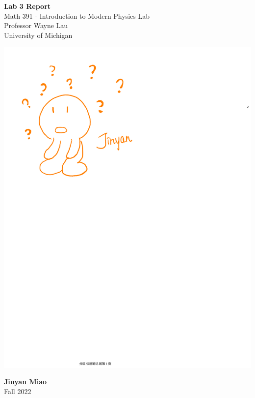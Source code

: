 \documentclass[11pt]{book}
\theoremstyle{break}
\theoremstyle{break}
\begin{document}
	\begin{titlepage}
		\begin{center}
			\vspace*{1cm}
			\Huge \color{red}
				\textbf{Lab 3 Report}\\
			\vspace{0.5cm}			
			\Large \color{black}
				Math 391 - Introduction to Modern Physics Lab\\
				Professor Wayne Lau\\	
				University of Michigan\\
			\vspace{3cm}

			\includegraphics[scale=0.8]{Jinyan'sQuestion.pdf}
			
			
			\vspace{5cm}
			\LARGE
				\textbf{Jinyan Miao}\\
				\hfill\break
				\LARGE Fall 2022\\
			\vspace{1cm}

		\vspace*{\fill}
		\end{center}			
	\end{titlepage}
\end{document}
